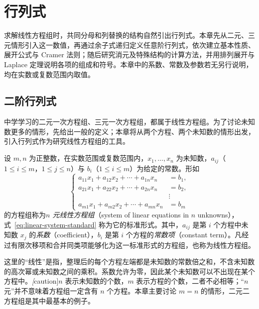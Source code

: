 \setcounter{chapter}{0} %
\chapter{行列式}
\label{chap:determinants}

求解线性方程组时，共同分母和列替换的结构自然引出行列式。本章先从二元、三元情形引入这一数值，再通过余子式递归定义任意阶行列式，依次建立基本性质、展开公式与 Cramer 法则；随后研究消元及特殊结构的计算方法，并用排列展开与 Laplace 定理说明各项的组成和符号。本章中的系数、常数及参数若无另行说明，均在实数或复数范围内取值。

\section{二阶行列式}

中学学习的二元一次方程组、三元一次方程组，都属于线性方程组。为了讨论未知数更多的情形，先给出一般的定义；本章将从两个方程、两个未知数的情形出发，引入行列式作为研究线性方程组的工具。

\begin{definition}
\label{def:linear-system}
设 $m,n$ 为正整数，在实数范围或复数范围内，$x_1,\ldots,x_n$ 为未知数，$a_{ij}$（$1\leq i\leq m$，$1\leq j\leq n$）与 $b_i$（$1\leq i\leq m$）为给定的常数。形如
\begin{equation}
\label{eq:linear-system-standard}
    \left\{
    \begin{aligned}
        a_{11}x_1+a_{12}x_2+\cdots+a_{1n}x_n&=b_1,\\
        a_{21}x_1+a_{22}x_2+\cdots+a_{2n}x_n&=b_2,\\
        &\vdots\\
        a_{m1}x_1+a_{m2}x_2+\cdots+a_{mn}x_n&=b_m
    \end{aligned}
    \right.
\end{equation}
的方程组称为\emph{$n$ 元线性方程组}（system of linear equations in $n$ unknowns），式~\eqref{eq:linear-system-standard} 称为它的标准形式。其中，$a_{ij}$ 是第 $i$ 个方程中未知数 $x_j$ 的\emph{系数}（coefficient），$b_i$ 是第 $i$ 个方程的\emph{常数项}（constant term）。凡经过有限次移项和合并同类项能够化为这一标准形式的方程组，也称为线性方程组。
\end{definition}

这里的“线性”是指，整理后的每个方程左端都是未知数的常数倍之和，不含未知数的高次幂或未知数之间的乘积。系数允许为零，因此某个未知数可以不出现在某个方程中。\emph[caution]{$n$ 表示未知数的个数，$m$ 表示方程的个数，二者不必相等}；“$n$ 元”并不意味着方程组一定含有 $n$ 个方程。本章主要讨论 $m=n$ 的情形，二元二方程组是其中最基本的例子。

